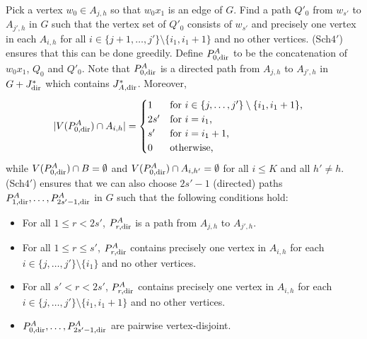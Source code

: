 \documentclass{memo-l}
\numberwithin{section}{chapter}
\numberwithin{equation}{section}
\numberwithin{firstthm}{section}
\numberwithin{figure}{section}
\begin{document}
Pick a vertex $w_0 \in A_{j,h}$ so that $w_{0} x_1$ is an edge of $G$.
Find a path $Q'_0$ from $w_{s'}$ to $A_{j',h}$ in $G$ such that the vertex set of $Q'_0$ consists of $w_{s'}$ and precisely one vertex in
each $A_{i,h}$ for all $i \in \{j+1, \dots, j' \} \setminus \{i_1, i_1+1 \}$ and no other vertices.
(Sch$4'$) ensures that this can be done greedily.
Define $P^A_{0,{\rm dir}}$ to be the concatenation of $w_0 x_1$, $Q_0$ and $Q'_0$.
Note that $P^A_{0,{\rm dir}}$ is a directed path from $A_{j,h}$ to $A_{j',h}$ in $G + J^*_{\rm dir}$ which contains $J^{*}_{A, {\rm dir}}$.
Moreover, 
\begin{align*}
	 |V(P^A_{0,{\rm dir}}) \cap A_{i,h}| &= 
	 \begin{cases}
	1	& \text{for $i \in \{j, \dots, j'\} \setminus \{i_1 , i_1+1 \}$,}\\
	2s'	& \text{for $i = i_1$,}\\
	s'	& \text{for $i = i_1+1$,}\\
	0	& \text{otherwise,}
	 \end{cases}
\end{align*}
while $V(P^A_{0,{\rm dir}}) \cap B = \emptyset$ and $V(P^A_{0,{\rm dir}}) \cap A_{i,h'}=\emptyset$ for all $i \le K$ and all $h' \ne h$.
(Sch$4'$) ensures that we can also choose $2s'-1$ (directed) paths $P^A_{1, {\rm dir} }, \dots, P^A_{2s'-1, {\rm dir} }$ in $G$ such that
the following conditions hold: 
\begin{itemize}
	\item For all $1 \le r < 2s'$, $P^A_{r, {\rm dir} }$ is a path from $A_{j,h}$ to $A_{j',h}$.
	\item For all $1 \le r \le s'$, $P^A_{r, {\rm dir} }$ contains precisely one vertex in $A_{i,h}$ for each $i\in \{j, \dots, j'\} \setminus \{i_1 \}$ and no other vertices.
	\item For all $s' <  r < 2s'$, $P^A_{r, {\rm dir} }$ contains precisely one vertex in $A_{i,h}$ for each $i\in \{j, \dots, j'\} \setminus \{i_1,i_1+1\}$ and no other vertices.
	\item $P^A_{0, {\rm dir} }, \dots, P^A_{2s'-1, {\rm dir} }$ are pairwise vertex-disjoint.
\end{itemize}
\end{document}
